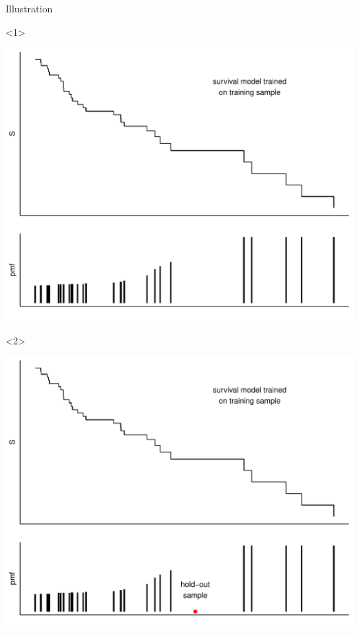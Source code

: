 \documentclass[smaller]{beamer}\usepackage{listings}
\begin{document}
\begin{frame}[label={sec:orga20cd6a}]{Illustration}
\begin{onlyenv}<1>
\begin{center}
\includegraphics[width=.9\linewidth]{fig-km-surv.pdf}
\end{center}
\end{onlyenv}

\begin{onlyenv}<2>
\begin{center}
\includegraphics[width=.9\linewidth]{fig-km-surv2.pdf}
\end{center}
\end{onlyenv}
\end{frame}
\end{document}
